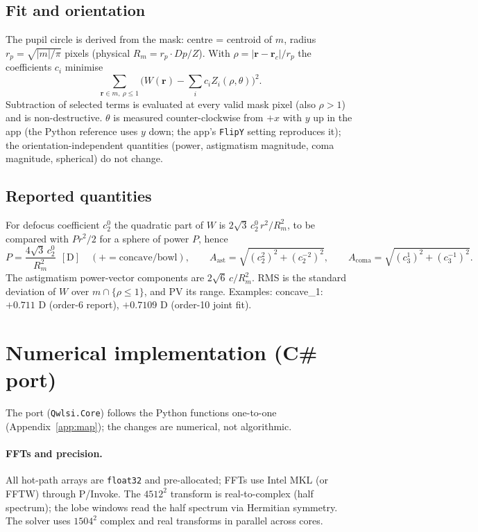 \documentclass[11pt,a4paper]{article}
\theoremstyle{definition}
\newcommand{\vr}{\bm{r}}
\newcommand{\code}[1]{\texttt{\small #1}}
\begin{document}
\subsection{Fit and orientation}
The pupil circle is derived from the mask: centre = centroid of $m$, radius $r_p=\sqrt{|m|/\pi}$ pixels (physical $R_m=r_p\cdot Dp/Z$). With $\rho=|\vr-\vr_c|/r_p$ the coefficients $c_i$ minimise
\begin{equation}
\sum_{\vr\in m,\ \rho\le1}\Big(W(\vr)-\sum_ic_iZ_i(\rho,\theta)\Big)^2 .
\end{equation}
Subtraction of selected terms is evaluated at every valid mask pixel (also $\rho>1$) and is non-destructive. $\theta$ is measured counter-clockwise from $+x$ with $y$ up in the app (the Python reference uses $y$ down; the app's \code{FlipY} setting reproduces it); the orientation-independent quantities (power, astigmatism magnitude, coma magnitude, spherical) do not change.

\subsection{Reported quantities}
For defocus coefficient $c_2^0$ the quadratic part of $W$ is $2\sqrt3\,c_2^0\,r^2/R_m^2$, to be compared with $Pr^2/2$ for a sphere of power $P$, hence
\begin{equation}
P=\frac{4\sqrt3\,c_2^{0}}{R_m^{2}}\ \ [\mathrm D]\quad(+=\text{concave/bowl}),\qquad
A_{\mathrm{ast}}=\sqrt{(c_2^{2})^2+(c_2^{-2})^2},\qquad
A_{\mathrm{coma}}=\sqrt{(c_3^{1})^2+(c_3^{-1})^2}.
\end{equation}
The astigmatism power-vector components are $2\sqrt6\,c/R_m^2$. RMS is the standard deviation of $W$ over $m\cap\{\rho\le1\}$, and PV its range. Examples: concave\_1: $+0.711$ D (order-6 report), $+0.7109$ D (order-10 joint fit).

\section{Numerical implementation (C\# port)}
\label{sec:impl}
The port (\code{Qwlsi.Core}) follows the Python functions one-to-one (Appendix~\ref{app:map}); the changes are numerical, not algorithmic.

\paragraph{FFTs and precision.}
All hot-path arrays are \code{float32} and pre-allocated; FFTs use Intel MKL (or FFTW) through P/Invoke. The $4512^2$ transform is real-to-complex (half spectrum); the lobe windows read the half spectrum via Hermitian symmetry.
The solver uses $1504^2$ complex and real transforms in parallel across cores.
\end{document}
